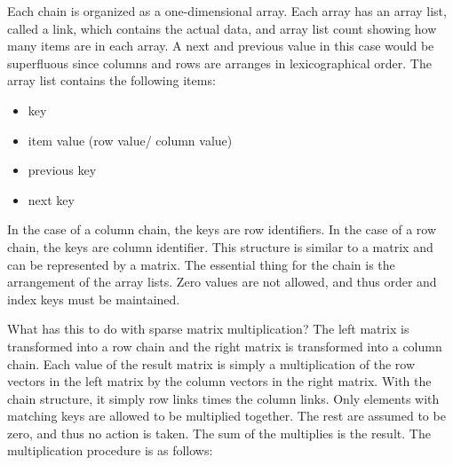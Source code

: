 \documentclass[11pt]{article}
\begin{document}
Each chain is organized as a one-dimensional array.  Each array has an array list, called a link, which contains the actual data, and array list count showing how many items are in each array.  A next and previous value in this case would be superfluous since columns and rows are arranges in lexicographical order.  The array list contains the following items:
\begin{itemize}
\item key
\item item value (row value/ column value)
\item previous key
\item next key 
\end{itemize}

In the case of a column chain, the keys are row identifiers.   In the case of a row chain, the keys are column identifier.  This structure is similar to a matrix and can be represented by a matrix.  The essential thing for the chain is the arrangement of the array lists.  Zero values are not allowed, and thus order and index keys must be maintained.  

What has this to do with sparse matrix multiplication?  The left matrix is transformed into a row chain and the right matrix is transformed into a column chain.  Each value of the result matrix is simply a multiplication of the row vectors in the left matrix by the column vectors in the right matrix.  With the chain structure, it simply row links times the column links.  Only elements with matching keys are allowed to be multiplied together.  The rest are assumed to be zero, and thus no action is taken.  The sum of the multiplies is the result.  The multiplication procedure is as follows:
\end{document}
